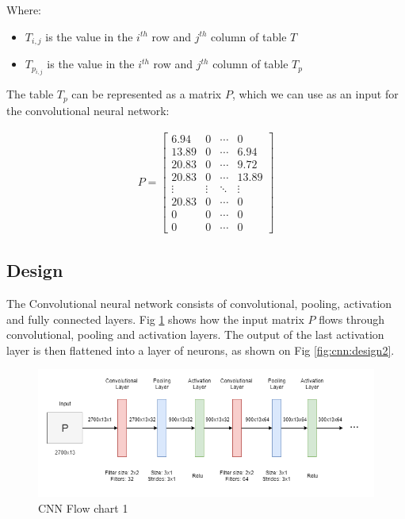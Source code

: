 \par
Where:
\begin{itemize}
	\item $T_{i,j}$ is the value in the  $i^{th}$  row and $j^{th}$ column of table $T$
	\item $T_{p_{i,j}}$ is the value in the $i^{th}$ row and $j^{th}$ column of table $T_p$
\end{itemize}

\par
The table $T_p$ can be represented as a matrix $P$, which we can use as an input for the convolutional neural network:

\begin{align*}
        P = 
        \begin{bmatrix}
            6.94     & 0        & \cdots & 0        \\
            13.89    & 0        & \cdots & 6.94     \\
            20.83    & 0        & \cdots & 9.72     \\
            20.83    & 0        & \cdots & 13.89    \\
            \vdots   & \vdots   & \ddots & \vdots   \\
            20.83    & 0        & \cdots & 0        \\
            0        & 0        & \cdots & 0        \\
            0        & 0        & \cdots & 0        
        \end{bmatrix}
\end{align*}

\subsection{Design}
\label{sec:cnn:design}

\par 
The Convolutional neural network consists of convolutional, pooling, activation and fully connected layers. Fig \ref{fig:cnn:design1} shows how the input matrix $P$ flows through convolutional, pooling and activation layers. The output of the last activation layer is then flattened into a layer of neurons, as shown on Fig \ref{fig:cnn:design2}.

\begin{figure}[H]
    \centering
    \includegraphics[width=.9\textwidth]{Pictures/Cnn_design1.png}
    \caption{CNN Flow chart 1}
    \label{fig:cnn:design1}
\end{figure}

